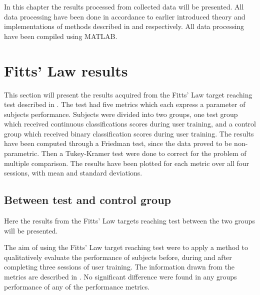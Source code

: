 
In this chapter the results processed from collected data will be presented. All data processing have been done in accordance to earlier introduced theory and implementations of methods described in  and  respectively. All data processing have been compiled using MATLAB.


\section{Fitts' Law results} \label{sec:R:fitts}
This section will present the results acquired from the Fitts' Law target reaching test described in . The test had five metrics which each express a parameter of subjects performance. Subjects were divided into two groups, one test group which received continuous classifications scores during user training, and a control group which received binary classification scores during user training. The results have been computed through a Friedman test, since the data proved to be non-parametric. Then a Tukey-Kramer test were done to correct for the problem of multiple comparison. The results have been plotted for each metric over all four sessions, with mean and standard deviations.
 

\subsection{Between test and control group}
Here the results from the Fitts' Law targets reaching test between the two groups will be presented.

%

The aim of using the Fitts' Law target reaching test were to apply a method to qualitatively evaluate the performance of subjects before, during and after completing three sessions of user training. The information drawn from the metrics are described in . No significant difference were found in any groups performance of any of the performance metrics. %

